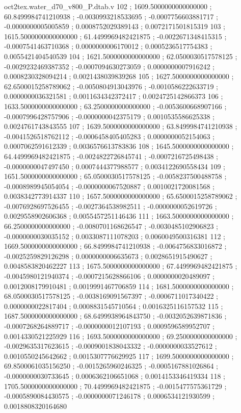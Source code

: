 \begin{filecontents}[overwrite]{oct2tex.water_d70_v800_P.dtab.v}
102 ; 1609.5000000000000000 ; 60.8499984741210938 ; -0.0030993218533695 ; -0.0007756603881717 ; -0.0000000005005859 ; 0.0008752029389143 ; 0.0072171501815319
103 ; 1615.5000000000000000 ; 61.4499969482421875 ; -0.0022671348415315 ; -0.0007541463710368 ; 0.0000000006170012 ; 0.0005236517754383 ; 0.0055421404540539
104 ; 1621.5000000000000000 ; 62.0500030517578125 ; -0.0029232469387352 ; -0.0007094630273059 ; 0.0000000007916242 ; 0.0008230328094214 ; 0.0021438039839268
105 ; 1627.5000000000000000 ; 62.6500015258789062 ; -0.0050804913043976 ; -0.0010586222633719 ; 0.0000000036321581 ; 0.0011634342372417 ; 0.0024725142866373
106 ; 1633.5000000000000000 ; 63.2500000000000000 ; -0.0053600668907166 ; -0.0007996428757906 ; -0.0000000042375179 ; 0.0010535586625338 ; 0.0024761743843555
107 ; 1639.5000000000000000 ; 63.8499984741210938 ; -0.0041526518762112 ; -0.0006458405405283 ; 0.0000000052154063 ; 0.0007062591612339 ; 0.0036576613783836
108 ; 1645.5000000000000000 ; 64.4499969482421875 ; -0.0024822726845741 ; -0.0007216725498438 ; -0.0000000047497450 ; 0.0007444377988577 ; 0.0034122690558434
109 ; 1651.5000000000000000 ; 65.0500030517578125 ; -0.0058237500488758 ; -0.0008989945054054 ; -0.0000000067520887 ; 0.0010021720081568 ; 0.0038342773914337
110 ; 1657.5000000000000000 ; 65.6500015258789062 ; -0.0076928697526455 ; -0.0027364538982511 ; -0.0000000052619726 ; 0.0029558902606368 ; 0.0055457251146436
111 ; 1663.5000000000000000 ; 66.2500000000000000 ; -0.0080701168626547 ; -0.0030485102906823 ; -0.0000000030035152 ; 0.0033087111078203 ; 0.0060049500316381
112 ; 1669.5000000000000000 ; 66.8499984741210938 ; -0.0064756833016872 ; -0.0025259829126298 ; 0.0000000006635673 ; 0.0028651915490627 ; 0.0048583820462227
113 ; 1675.5000000000000000 ; 67.4499969482421875 ; -0.0045980121940374 ; -0.0007215628866106 ; 0.0000000020489097 ; 0.0012008179910481 ; 0.0019991467706859
114 ; 1681.5000000000000000 ; 68.0500030517578125 ; -0.0038169091567397 ; -0.0006711017340422 ; 0.0000000022817404 ; 0.0008831545710564 ; 0.0016325116157532
115 ; 1687.5000000000000000 ; 68.6499938964843750 ; -0.0032052639871836 ; -0.0007268264889717 ; -0.0000000012107193 ; 0.0009596589952707 ; 0.0014330521225929
116 ; 1693.5000000000000000 ; 69.2500000000000000 ; -0.0029635317623615 ; -0.0009001838043332 ; -0.0000000033527612 ; 0.0010550245642662 ; 0.0015307776629925
117 ; 1699.5000000000000000 ; 69.8500061035156250 ; -0.0015265960246325 ; -0.0005167881026864 ; -0.0000000030733645 ; 0.0006362106651068 ; 0.0014153346419334
118 ; 1705.5000000000000000 ; 70.4499969482421875 ; -0.0015477575361729 ; -0.0005890084430575 ; -0.0000000071246178 ; 0.0006534121930599 ; 0.0018808320164680

\end{filecontents}
